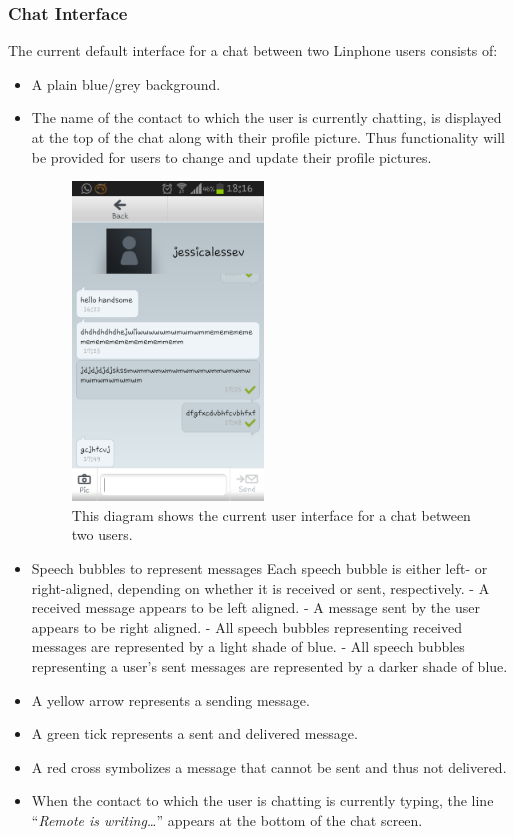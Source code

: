\documentclass[11pt]{article}
\begin{document}
\subsubsection{Chat Interface}
The current default interface for a chat between two Linphone users consists of:
\begin{itemize}
\item	A plain blue/grey background.
\item	The name of the contact to which the user is currently chatting, is displayed at the top of the chat along with their profile picture.
\subitem Thus functionality will be provided for users to change and update their profile pictures.
\begin{figure}[H]
\centering
\includegraphics[width=2in]{./images/screen.png}
\caption[Sample Chat Screen]{This diagram shows the current user interface for a chat between two users.}
\label{cd-chat-interface}
\end{figure}
\item	Speech bubbles to represent messages
\subitem	Each speech bubble is either left- or right-aligned, depending on whether it is received or sent, respectively.
\subitem	- A received message appears to be left aligned.
\subitem	- A message sent by the user appears to be right aligned.
\subitem	- All speech bubbles representing received messages are represented by a light shade of blue.
\subitem	- All speech bubbles representing a user's sent messages are represented by a darker shade of blue.
\item	A yellow arrow represents a sending message.
\item	A green tick represents a sent and delivered message.
\item	A red cross symbolizes a message that cannot be sent and thus not delivered.
\item	When the contact to which the user is chatting is currently typing, the line \enquote{\textit{Remote is writing\ldots}} appears at the bottom of the chat screen.

\end{itemize}
\end{document}
